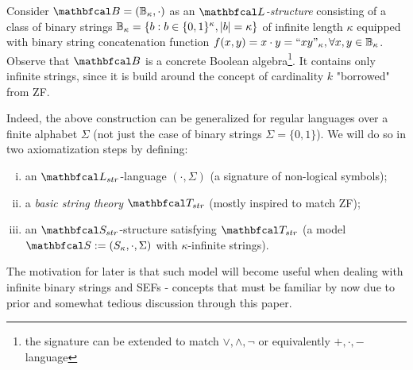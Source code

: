 Consider $\LsB = (\cbin_\kappa, \cdot)$ as an \textit{$\lsign$-structure} consisting of a class of binary strings $\mathbb{B}_\kappa = \{b : b \in \{0,1\}^{\kappa}, |b| = \kappa\}$ of infinite length $\kappa$ equipped with binary string concatenation function $f(x,y) = x\cdot y = \text{``} xy\text{''} _\kappa, \forall x,y \in \mathbb{B}_\kappa$. Observe that $\LsB$ is a concrete Boolean algebra\footnote{the signature can be extended to match $\lor, \land, \neg$ or equivalently $+, \cdot, -$ language}. It contains only infinite strings, since it is build around the concept of cardinality $k$ "borrowed" from ZF.

Indeed, the above construction can be generalized for regular languages over a finite alphabet $\Sigma$ (not just the case of binary strings $\Sigma = \{0,1\}$). We will do so in two axiomatization steps by defining: 
  \begin{enumerate}[i)]
    \item an $\lsign_{str}$-language $(\cdot, \Sigma)$ (a signature of non-logical symbols); 
    \item a \textit{basic string theory} $\LsT_{str}$ (mostly inspired to match ZF);
    \item an $\LsS_{str}$-structure satisfying $\LsT_{str}$ (a model $\LsS := (S_{\kappa}, \cdot, \Sigma)$ with $\kappa$-infinite strings).
  \end{enumerate}

The motivation for later is that such model will become useful when dealing with infinite binary strings and SEFs - concepts that must be familiar by now due to prior and somewhat tedious discussion through this paper.


